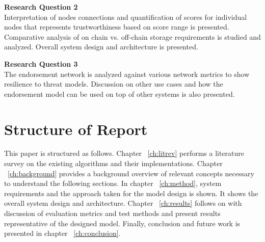 \textbf{Research Question 2 } \\
Interpretation of nodes connections and quantification of scores for individual
nodes that represents trustworthiness based on score range is presented.
Comparative analysis of on chain vs. off-chain storage requirements is 
studied and analyzed. Overall system design and architecture is presented. 

\textbf{Research Question 3} \\
The endorsement network is analyzed against various network metrics to
show resilience to threat models. Discussion on other use cases and how the
endorsement model can be used on top of other systems is also presented.

%
%


\section{Structure of Report}
This paper is structured as follows. Chapter ~\ref{ch:litrev} performs a
literature survey on the existing algorithms and their implementations. Chapter
~\ref{ch:background} provides a background overview of relevant concepts
necessary to understand the following sections. In chapter ~\ref{ch:method},
system requirements and the approach taken for the model design is shown. It
shows the overall system design and architecture. Chapter ~\ref{ch:results}
follows on with discussion of evaluation metrics and test methods and present
results representative of the designed model. Finally, conclusion and future
work is presented in chapter ~\ref{ch:conclusion}. 



